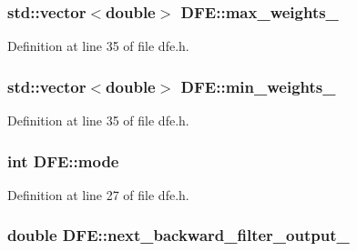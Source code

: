 \subsubsection[{max\+\_\+weights\+\_\+}]{\setlength{\rightskip}{0pt plus 5cm}std\+::vector$<$double$>$ D\+F\+E\+::max\+\_\+weights\+\_\+\hspace{0.3cm}{\ttfamily [protected]}}\label{class_d_f_e_a469a8b4a5abe34c8fc769676a9c9ffbf}


Definition at line 35 of file dfe.\+h.

\hypertarget{class_d_f_e_a9ccbe12d16eb4fb19dc69235fddd89c3}{}
\subsubsection[{min\+\_\+weights\+\_\+}]{\setlength{\rightskip}{0pt plus 5cm}std\+::vector$<$double$>$ D\+F\+E\+::min\+\_\+weights\+\_\+\hspace{0.3cm}{\ttfamily [protected]}}\label{class_d_f_e_a9ccbe12d16eb4fb19dc69235fddd89c3}


Definition at line 35 of file dfe.\+h.

\hypertarget{class_d_f_e_a0202ee4a4e6bc6ad385e7885383691c6}{}
\subsubsection[{mode}]{\setlength{\rightskip}{0pt plus 5cm}int D\+F\+E\+::mode}\label{class_d_f_e_a0202ee4a4e6bc6ad385e7885383691c6}


Definition at line 27 of file dfe.\+h.

\hypertarget{class_d_f_e_aad542a71162acadaa9cf2ea783bcd1b7}{}
\subsubsection[{next\+\_\+backward\+\_\+filter\+\_\+output\+\_\+}]{\setlength{\rightskip}{0pt plus 5cm}double D\+F\+E\+::next\+\_\+backward\+\_\+filter\+\_\+output\+\_\+\hspace{0.3cm}{\ttfamily [protected]}}\label{class_d_f_e_aad542a71162acadaa9cf2ea783bcd1b7}


